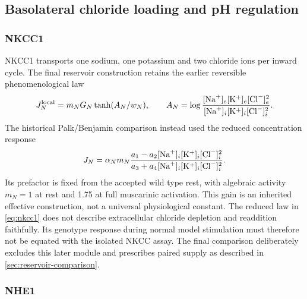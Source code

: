 \subsection{Basolateral chloride loading and pH regulation}

\subsubsection{NKCC1}

NKCC1 transports one sodium, one potassium and two chloride ions per inward cycle. The final reservoir construction retains the earlier reversible phenomenological law
\begin{equation}
 J_N^{\rm local}=m_N G_N\tanh(A_N/w_N),\qquad
 A_N=\log\frac{[\mathrm{Na}^{+}]_e[\mathrm{K}^{+}]_e[\mathrm{Cl}^{-}]_e^2}{[\mathrm{Na}^{+}]_i[\mathrm{K}^{+}]_i[\mathrm{Cl}^{-}]_i^2}.
 \label{eq:nkcc-prepalk}
\end{equation}
The historical Palk/Benjamin comparison instead used the reduced concentration response \citep{Benjamin1997,Palk2010}
\begin{equation}
 J_N=\alpha_N m_N
 \frac{a_1-a_2[\mathrm{Na}^{+}]_i[\mathrm{K}^{+}]_i[\mathrm{Cl}^{-}]_i^2}
      {a_3+a_4[\mathrm{Na}^{+}]_i[\mathrm{K}^{+}]_i[\mathrm{Cl}^{-}]_i^2}.
 \label{eq:nkcc1}
\end{equation}
Its prefactor is fixed from the accepted wild type rest, with algebraic activity $m_N=1$ at rest and 1.75 at full muscarinic activation. This gain is an inherited effective construction, not a universal physiological constant. The reduced law in \cref{eq:nkcc1} does not describe extracellular chloride depletion and readdition faithfully. Its genotype response during normal model stimulation must therefore not be equated with the isolated NKCC assay. The final comparison deliberately excludes this later module and prescribes paired supply as described in \cref{sec:reservoir-comparison}.

\subsubsection{NHE1}


